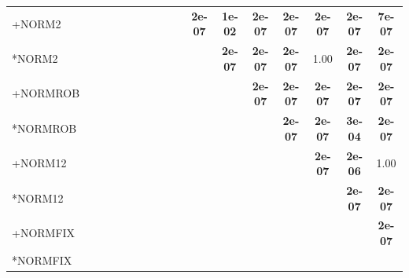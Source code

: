 \begin{table}[t]
{\begin{tabular}{lcccccccccccccccc}
+NORM2 &  &  &  &  &  &  &  &  &  & \textbf{2e-07} & \textbf{1e-02} & \textbf{2e-07} & \textbf{2e-07} & \textbf{2e-07} & \textbf{2e-07} & \textbf{7e-07} \\
*NORM2 &  &  &  &  &  &  &  &  &  &  & \textbf{2e-07} & \textbf{2e-07} & \textbf{2e-07} & 1.00 & \textbf{2e-07} & \textbf{2e-07} \\
+NORMROB &  &  &  &  &  &  &  &  &  &  &  & \textbf{2e-07} & \textbf{2e-07} & \textbf{2e-07} & \textbf{2e-07} & \textbf{2e-07} \\
*NORMROB &  &  &  &  &  &  &  &  &  &  &  &  & \textbf{2e-07} & \textbf{2e-07} & \textbf{3e-04} & \textbf{2e-07} \\
+NORM12 &  &  &  &  &  &  &  &  &  &  &  &  &  & \textbf{2e-07} & \textbf{2e-06} & 1.00 \\
*NORM12 &  &  &  &  &  &  &  &  &  &  &  &  &  &  & \textbf{2e-07} & \textbf{2e-07} \\
+NORMFIX &  &  &  &  &  &  &  &  &  &  &  &  &  &  &  & \textbf{2e-07} \\
*NORMFIX &  &  &  &  &  &  &  &  &  &  &  &  &  &  &  &  \\
\bottomrule
\end{tabular}
}
\end{table}

